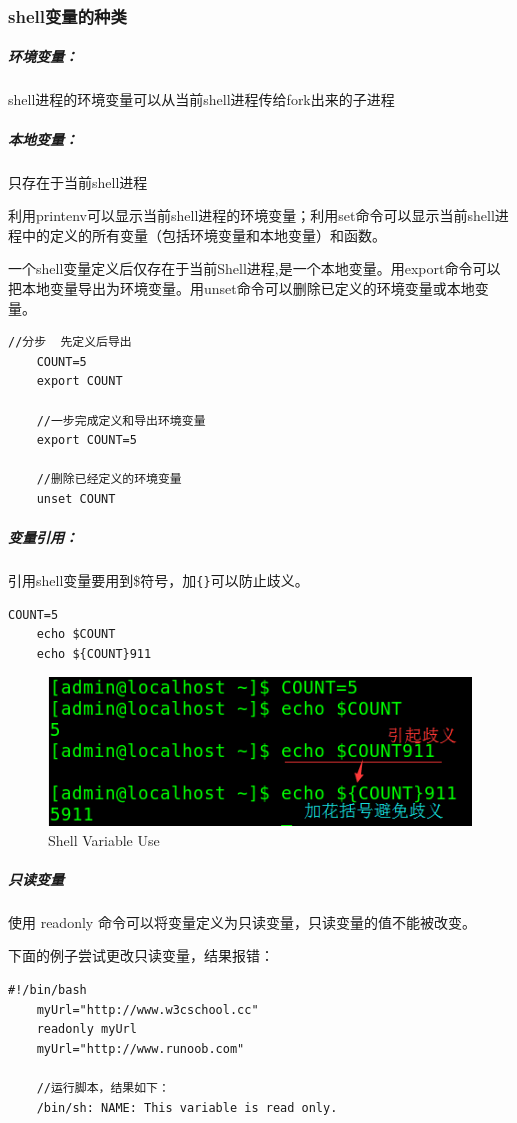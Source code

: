 \documentclass[UTF8,a4paper,12pt]{ctexbook}
\begin{document}
			 \subsubsection{shell变量的种类}
				 \subparagraph{环境变量：}shell进程的环境变量可以从当前shell进程传给fork出来的子进程
				 \subparagraph{本地变量：}只存在于当前shell进程
				 
				 利用printenv可以显示当前shell进程的环境变量；利用set命令可以显示当前shell进程中的定义的所有变量（包括环境变量和本地变量）和函数。
				 
				 一个shell变量定义后仅存在于当前Shell进程,是一个本地变量。用export命令可以把本地变量导出为环境变量。用unset命令可以删除已定义的环境变量或本地变量。
					 \begin{lstlisting}[frame=L,xleftmargin=.06\textwidth]
	//分步  先定义后导出
	COUNT=5
	export COUNT
	
	//一步完成定义和导出环境变量
	export COUNT=5 
	
	//删除已经定义的环境变量
	unset COUNT
					 \end{lstlisting}
				
				\subparagraph{变量引用：}引用shell变量要用到\$符号，加\verb|{}|可以防止歧义。
					\begin{lstlisting}[frame=L,xleftmargin=.06\textwidth]
	COUNT=5
	echo $COUNT
	echo ${COUNT}911
					\end{lstlisting}
				
					\begin{figure}[h]
						\centering
						\includegraphics[scale = 0.7]{figure/ShellRefVariable.png}
						\caption{Shell Variable Use}
					\end{figure}
				\subparagraph{只读变量}
					使用 readonly 命令可以将变量定义为只读变量，只读变量的值不能被改变。
					
					下面的例子尝试更改只读变量，结果报错：
					\begin{lstlisting}[frame=L,xleftmargin=.06\textwidth]
	#!/bin/bash
	myUrl="http://www.w3cschool.cc"
	readonly myUrl
	myUrl="http://www.runoob.com"
	
	//运行脚本，结果如下：
	/bin/sh: NAME: This variable is read only.
					\end{lstlisting}
					
\end{document}
